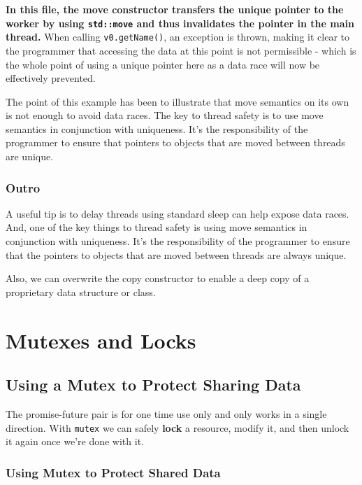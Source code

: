 \documentclass[11pt, a4paper]{article}
\begin{document}
\textbf{In this file, the move constructor transfers the unique pointer to the worker by using \texttt{std::move}  and thus invalidates the pointer in the main thread.} When calling \texttt{v0.getName()}, an exception is thrown, making it clear to the programmer that accessing the data at this point is not permissible - which is the whole point of using a unique pointer here as a data race will now be effectively prevented. 

The point of this example has been to illustrate that move semantics on its own is not enough to avoid data races. The key to thread safety is to use move semantics in conjunction with uniqueness. It's the responsibility of the programmer to ensure that pointers to objects that are moved between threads are unique.



\subsubsection{Outro}%
\label{ssub:outro}

A useful tip is to delay threads using standard sleep can help expose data races. And, one of the key things to thread safety is using move semantics in conjunction with uniqueness. It's the responsibility of the programmer to ensure that the pointers to objects that are moved between threads are always unique. 

Also, we can overwrite the copy constructor to enable a deep copy of a proprietary data structure or class. 



\section{Mutexes and Locks}%
\label{sec:mutexes_and_locks}


\subsection{Using a Mutex to Protect Sharing Data}%
\label{sub:using_a_mutex_to_protect_sharing_data}

The promise-future pair is for one time use only and only works in a single direction. With \texttt{mutex} we can safely \textbf{lock} a resource, modify it, and then unlock it again once we're done with it. 


\subsubsection{Using Mutex to Protect Shared Data}%
\label{ssub:using_mutex_to_protect_shared_data}
\end{document}
